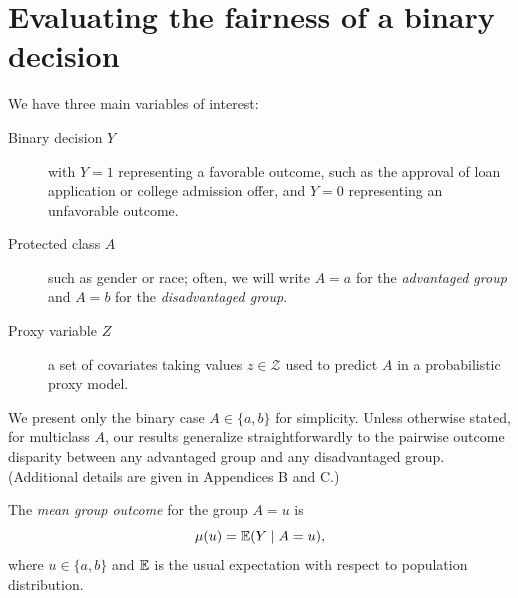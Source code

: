 \section{Evaluating the fairness of a binary decision}

We have three main variables of interest:

\begin{description}
\item[Binary decision $Y$]
with $Y = 1$ representing a favorable outcome, such as the approval of loan application or college admission offer, and $Y = 0$ representing an unfavorable outcome.

\item[Protected class $A$]
such as gender or race; often, we will 
write $A=a$ for
the \textit{advantaged group} and $A=b$ for the
\textit{disadvantaged group}.

\item[Proxy variable $Z$] a set of covariates taking values $z\in\mathcal{Z}$ used to predict ${A}$ in a probabilistic proxy model.
\end{description}

We present only the binary case $A\in\{a,b\}$ for simplicity. Unless otherwise stated, for multiclass $A$, our results generalize straightforwardly to the pairwise outcome disparity between any advantaged group and any disadvantaged group. 
(Additional details are given in Appendices B and C.)


\begin{definition}
\label{mean-group-outcome}
The \textit{mean group outcome} for the group $A=u$ is
\[
\mu(u) = \mathbb{E} (Y \mid A = u),
\]
where $u\in\{a,b\}$ and $\mathbb{E}$ is the usual expectation with respect to population distribution.
\end{definition}

